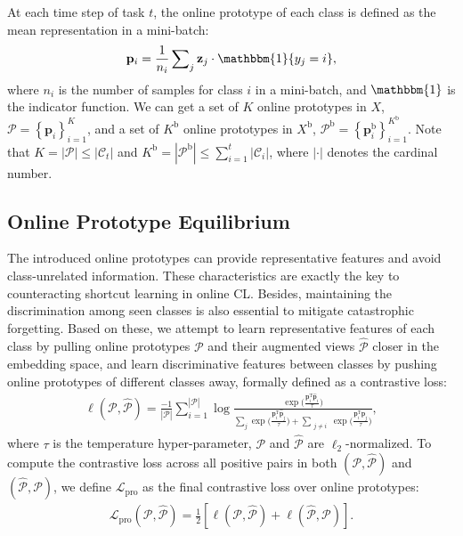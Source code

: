 At each time step of task $t$, the online prototype of each class is defined as the mean representation in a mini-batch:
\begin{align}
\label{eq:cal_p}
    \mathbf{p}_i = \frac{1}{n_i}\sum\nolimits_j\mathbf{z}_j\cdot \mathbbm{1}\{y_j = i\},
\end{align}
where $n_i$ is the number of samples for class $i$ in a mini-batch, and $\mathbbm{1}$ is the indicator function. 
We can get a set of $K$ online prototypes  in $X$, $\mathcal{P} = \left\{ \mathbf{p}_{i} \right\} ^{K}_{i=1}$, and a set of $K^\mathrm{b}$ online prototypes in $X^\mathrm{b}$, $\mathcal{P}^\mathrm{b} = \left\{ \mathbf{p}_i^\mathrm{b} \right\} ^{K^\mathrm{b}}_{i=1}$.
Note that $K = |\mathcal{P}| \leq |\mathcal{C}_t|$ and $K^\mathrm{b} = |\mathcal{P}^\mathrm{b}| \leq \sum_{i=1}^{t}|\mathcal{C}_i| $, where $|\cdot|$ denotes the cardinal number.



\subsection{Online Prototype Equilibrium}
The introduced online prototypes can provide representative features and avoid class-unrelated information.  
These characteristics are exactly the key to counteracting shortcut learning in online CL.
Besides, maintaining the discrimination among seen classes is also essential to mitigate catastrophic forgetting.
Based on these, we attempt to learn representative features of each class by pulling online prototypes $\mathcal{P}$ and their augmented views $\widehat{\mathcal{P}}$ closer in the embedding space, and learn discriminative features between classes by pushing online prototypes of different classes away, formally defined as a contrastive loss:
\begin{align}
\label{eq:proto_infoNCE}
    \ell(\mathcal{P},\widehat{\mathcal{P}})\!=\!
    \frac{-1}{|\mathcal{P}|}\sum_{i=1}^{|\mathcal{P}|}\!\log\! 
    \tfrac
    {\exp \big(\tfrac{{\mathbf{p}_i^\mathrm{T} \widehat{\mathbf{p}}_i}}{\tau}\big)}
    {
    \sum\limits_{j} \exp \big(\tfrac{{\mathbf{p}_i^\mathrm{T} \widehat{\mathbf{p}}_j}}{\tau}\big)
    +\!
    \sum\limits_{\substack{j \neq i}} \exp \big(\tfrac{{\mathbf{p}_i^\mathrm{T} \mathbf{p}_j}}{\tau}\big) 
    },
\end{align}
where 
$\tau$ is the temperature hyper-parameter, 
$\mathcal{P}$ and $\widehat{\mathcal{P}}$ are $\ell_2$-normalized. To compute the contrastive loss across all positive pairs in both $(\mathcal{P}, \widehat{\mathcal{P}})$ and $(\widehat{\mathcal{P}}, \mathcal{P})$, we define $\mathcal{L}_{\mathrm{pro}}$ as the final contrastive loss over online prototypes:
\begin{align}
    \mathcal{L}_{\mathrm{pro}}(\mathcal{P},\widehat{\mathcal{P}}) = 
    \frac{1}{2}
    \left[\ell(\mathcal{P}, \widehat{\mathcal{P}}) + \ell(\widehat{\mathcal{P}}, \mathcal{P})\right].
\end{align}



